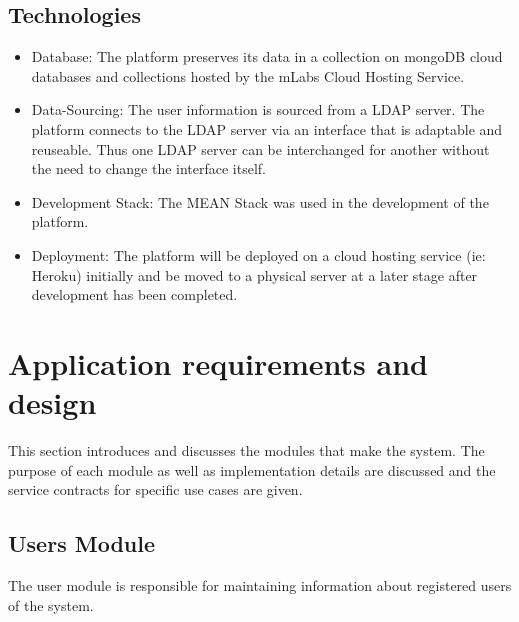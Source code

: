 \documentclass[12pt]{article}
\begin{document}
\subsection*{Technologies}
\begin{itemize}
\item {Database: The platform preserves its data in a collection on mongoDB cloud databases and collections hosted by the mLabs Cloud Hosting Service.}
\item {Data-Sourcing: The user information is sourced from a LDAP server. The platform connects to the LDAP server via an interface that is adaptable and reuseable. Thus one LDAP server can be interchanged for another without the need to change the interface itself.}
\item {Development Stack: The MEAN Stack was used in the development of the platform.}
\item {Deployment: The platform will be deployed on a cloud hosting service (ie: Heroku) initially and be moved to a physical server at a later stage after development has been completed.}
\end{itemize}

\newpage

\section{Application requirements and design}

\par{This section introduces and discusses the modules that make the system. The purpose of each module as well as implementation details are discussed and the service contracts for specific use cases are given. }


\subsection{Users Module}
\par {The user module is responsible for maintaining information about registered users of the system.}
\end{document}
